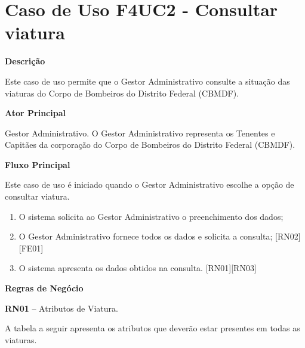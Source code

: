 
  \section{Caso de Uso F4UC2 - Consultar viatura}

  {\raggedright
      \textbf{Descrição}
  }

Este caso de uso permite que o Gestor Administrativo consulte a situação das viaturas do Corpo de 
Bombeiros do Distrito Federal (CBMDF).
    
  {\raggedright
      \textbf{Ator Principal}
  }

    Gestor Administrativo. O Gestor Administrativo representa os Tenentes e Capitães da corporação do Corpo de Bombeiros do Distrito
    Federal (CBMDF).

  {\raggedright
      \textbf{Fluxo Principal}
  }
  
Este caso de uso é iniciado quando o Gestor Administrativo escolhe a opção de consultar viatura.

  \begin{enumerate}

 \item O sistema solicita ao Gestor Administrativo o preenchimento dos dados;
 \item O Gestor Administrativo fornece todos os dados e solicita a consulta; [RN02][FE01]
 \item O sistema apresenta os dados obtidos na consulta. [RN01][RN03]
    
  \end{enumerate}
  
  
   {\raggedright
      \textbf{Regras de Negócio}
   }
   
   \textbf{RN01} – Atributos de Viatura.
   
 A tabela a seguir apresenta os atributos que deverão estar presentes em todas as viaturas.
 
